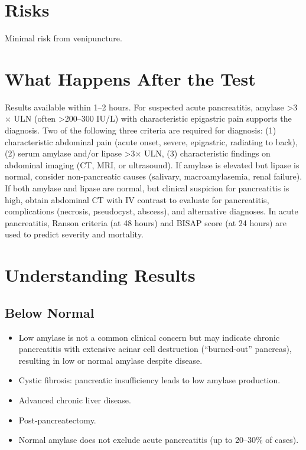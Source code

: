 \section*{Risks}
Minimal risk from venipuncture.

\section*{What Happens After the Test}
Results available within 1--2 hours. For suspected acute pancreatitis, amylase >3$\times$ ULN (often >200--300 IU/L) with characteristic epigastric pain supports the diagnosis. Two of the following three criteria are required for diagnosis: (1) characteristic abdominal pain (acute onset, severe, epigastric, radiating to back), (2) serum amylase and/or lipase >3$\times$ ULN, (3) characteristic findings on abdominal imaging (CT, MRI, or ultrasound). If amylase is elevated but lipase is normal, consider non-pancreatic causes (salivary, macroamylasemia, renal failure). If both amylase and lipase are normal, but clinical suspicion for pancreatitis is high, obtain abdominal CT with IV contrast to evaluate for pancreatitis, complications (necrosis, pseudocyst, abscess), and alternative diagnoses. In acute pancreatitis, Ranson criteria (at 48 hours) and BISAP score (at 24 hours) are used to predict severity and mortality.

\section*{Understanding Results}

\subsection*{Below Normal}
\begin{itemize}
  \item Low amylase is not a common clinical concern but may indicate chronic pancreatitis with extensive acinar cell destruction (``burned-out'' pancreas), resulting in low or normal amylase despite disease.
  \item Cystic fibrosis: pancreatic insufficiency leads to low amylase production.
  \item Advanced chronic liver disease.
  \item Post-pancreatectomy.
  \item Normal amylase does not exclude acute pancreatitis (up to 20--30\% of cases).
\end{itemize}

